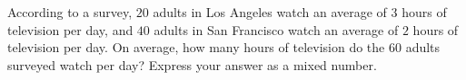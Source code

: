 According to a survey, $20$ adults in Los Angeles watch an average of $3$ hours of television per day, and $40$ adults in San Francisco watch an average of $2$ hours of television per day. On average, how many hours of television do the $60$ adults surveyed watch per day? Express your answer as a mixed number.
